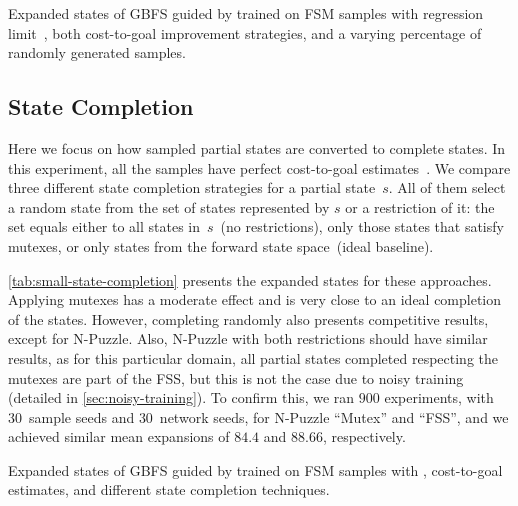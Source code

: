 \begin{table}[tb]
    \caption[Expanded states from a varying percentage of randomly generated samples.]{Expanded states of GBFS guided by \hnn trained on FSM samples with regression limit~\meanfx, both cost-to-goal improvement strategies, and a varying percentage of randomly generated samples.}
    \label{tab:small-random-samples}
    \addmargin
    \centering
    
\end{table}

\subsection{State Completion}
\label{sec:small-exps-state-completion}

Here we focus on how sampled partial states are converted to complete states. In this experiment, all the samples have perfect cost-to-goal estimates~\hstar. We compare three different state completion strategies for a partial state~$s$. All of them select a random state from the set of states represented by $s$ or a restriction of it: the set equals either to all states in~$s$~(no restrictions), only those states that satisfy mutexes, or only states from the forward state space~(ideal baseline).

\cref{tab:small-state-completion} presents the expanded states for these approaches. Applying mutexes has a moderate effect and is very close to an ideal completion of the states. However, completing randomly also presents competitive results, except for N-Puzzle. Also, N-Puzzle with both restrictions should have similar results, as for this particular domain, all partial states completed respecting the mutexes are part of the FSS, but this is not the case due to noisy training (detailed in \cref{sec:noisy-training}). To confirm this, we ran $900$ experiments, with $30$~sample seeds and $30$~network seeds, for N-Puzzle ``Mutex'' and ``FSS'', and we achieved similar mean expansions of $84.4$ and $88.66$, respectively.

\begin{table}[tb]
    \caption[Expanded states from different state completion techniques.]{Expanded states of GBFS guided by \hnn trained on FSM samples with \rlmeanfx, \hstar cost-to-goal estimates, and different state completion techniques.}
    \label{tab:small-state-completion}
    \addmargin
    \centering
    
\end{table}


